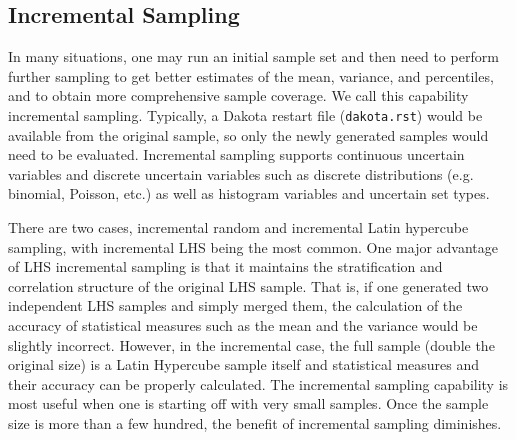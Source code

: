 \subsection{Incremental Sampling}\label{uq:incremental}

In many situations, one may run an initial sample set and then need to
perform further sampling to get better estimates of the mean,
variance, and percentiles, and to obtain more comprehensive sample
coverage. We call this capability incremental sampling.  Typically, a
Dakota restart file (\texttt{dakota.rst}) would be available from the
original sample, so only the newly generated samples would need to be
evaluated.  Incremental sampling supports continuous uncertain
variables and discrete uncertain variables such as discrete
distributions (e.g.  binomial, Poisson, etc.) as well as histogram
variables and uncertain set types.

There are two cases, incremental random and incremental Latin
hypercube sampling, with incremental LHS being the most common.  One
major advantage of LHS incremental sampling is that it maintains the
stratification and correlation structure of the original LHS sample.
That is, if one generated two independent LHS samples and simply
merged them, the calculation of the accuracy of statistical measures
such as the mean and the variance would be slightly
incorrect. However, in the incremental case, the full sample (double
the original size) is a Latin Hypercube sample itself and statistical
measures and their accuracy can be properly calculated. The
incremental sampling capability is most useful when one is starting
off with very small samples. Once the sample size is more than a few
hundred, the benefit of incremental sampling diminishes.

